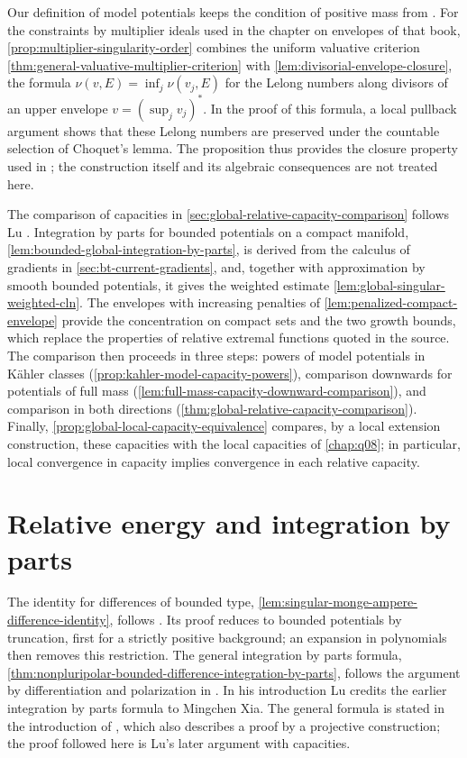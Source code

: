 Our definition of model potentials keeps the condition of positive mass from \cite[Definition~3.1.3]{XiaSampleBook}. For the constraints by multiplier ideals used in the chapter on envelopes of that book, \cref{prop:multiplier-singularity-order} combines the uniform valuative criterion \cref{thm:general-valuative-multiplier-criterion} with \cref{lem:divisorial-envelope-closure}, the formula $\nu(v,E)=\inf_j\nu(v_j,E)$ for the Lelong numbers along divisors of an upper envelope $v=(\sup_jv_j)^*$. In the proof of this formula, a local pullback argument shows that these Lelong numbers are preserved under the countable selection of Choquet's lemma. The proposition thus provides the closure property used in \cite[Propositions~3.2.6 and~3.2.9]{XiaSampleBook}; the construction itself and its algebraic consequences are not treated here.

The comparison of capacities in \cref{sec:global-relative-capacity-comparison} follows Lu \cite[Lemmas 3.1--3.4 and Theorem 3.5]{Lu21}. Integration by parts for bounded potentials on a compact manifold, \cref{lem:bounded-global-integration-by-parts}, is derived from the calculus of gradients in \cref{sec:bt-current-gradients}, and, together with approximation by smooth bounded potentials, it gives the weighted estimate \cref{lem:global-singular-weighted-cln}. The envelopes with increasing penalties of \cref{lem:penalized-compact-envelope} provide the concentration on compact sets and the two growth bounds, which replace the properties of relative extremal functions quoted in the source. The comparison then proceeds in three steps: powers of model potentials in K\"ahler classes (\cref{prop:kahler-model-capacity-powers}), comparison downwards for potentials of full mass (\cref{lem:full-mass-capacity-downward-comparison}), and comparison in both directions (\cref{thm:global-relative-capacity-comparison}). Finally, \cref{prop:global-local-capacity-equivalence} compares, by a local extension construction, these capacities with the local capacities of \cref{chap:q08}; in particular, local convergence in capacity implies convergence in each relative capacity.

\section{Relative energy and integration by parts}\label{sec:history-energy}
The identity for differences of bounded type, \cref{lem:singular-monge-ampere-difference-identity}, follows \cite[Lemma 4.1]{Lu21}. Its proof reduces to bounded potentials by truncation, first for a strictly positive background; an expansion in polynomials then removes this restriction. The general integration by parts formula, \cref{thm:nonpluripolar-bounded-difference-integration-by-parts}, follows the argument by differentiation and polarization in \cite[proof of Theorem 1.2]{Lu21}. In his introduction Lu credits the earlier integration by parts formula to Mingchen Xia. The general formula is stated in the introduction of \cite[Theorem 1.1 and discussion]{Xia2019v1}, which also describes a proof by a projective construction; the proof followed here is Lu's later argument with capacities.

